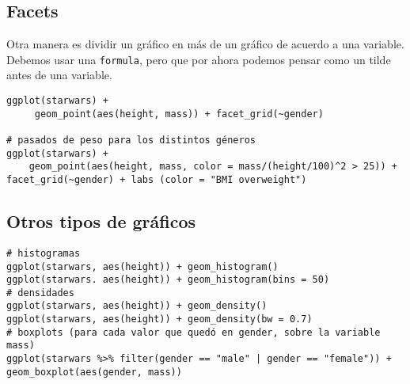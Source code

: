 \documentclass[]{article}
\begin{document}
\hypertarget{facets}{%
\subsection{Facets}\label{facets}}

Otra manera es dividir un gráfico en más de un gráfico de acuerdo a una
variable. Debemos usar una \texttt{formula}, pero que por ahora podemos
pensar como un tilde antes de una variable.

\begin{verbatim}
ggplot(starwars) + 
     geom_point(aes(height, mass)) + facet_grid(~gender)

# pasados de peso para los distintos géneros
ggplot(starwars) + 
    geom_point(aes(height, mass, color = mass/(height/100)^2 > 25)) + facet_grid(~gender) + labs (color = "BMI overweight")
\end{verbatim}

\hypertarget{otros-tipos-de-gruxe1ficos}{%
\subsection{Otros tipos de gráficos}\label{otros-tipos-de-gruxe1ficos}}

\begin{verbatim}
# histogramas
ggplot(starwars, aes(height)) + geom_histogram()
ggplot(starwars. aes(height)) + geom_histogram(bins = 50)
# densidades
ggplot(starwars, aes(height)) + geom_density()
ggplot(starwars, aes(height)) + geom_density(bw = 0.7)
# boxplots (para cada valor que quedó en gender, sobre la variable mass)
ggplot(starwars %>% filter(gender == "male" | gender == "female")) + geom_boxplot(aes(gender, mass))
\end{verbatim}
\end{document}
